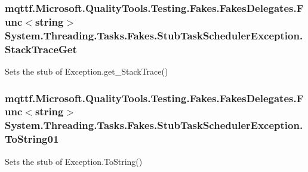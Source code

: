 \hypertarget{class_system_1_1_threading_1_1_tasks_1_1_fakes_1_1_stub_task_scheduler_exception_a90722a633e78193a75e29cc13f26b8ec}{
\subsubsection[{Stack\-Trace\-Get}]{\setlength{\rightskip}{0pt plus 5cm}mqttf.\-Microsoft.\-Quality\-Tools.\-Testing.\-Fakes.\-Fakes\-Delegates.\-Func$<$string$>$ System.\-Threading.\-Tasks.\-Fakes.\-Stub\-Task\-Scheduler\-Exception.\-Stack\-Trace\-Get}}\label{class_system_1_1_threading_1_1_tasks_1_1_fakes_1_1_stub_task_scheduler_exception_a90722a633e78193a75e29cc13f26b8ec}


Sets the stub of Exception.\-get\-\_\-\-Stack\-Trace()

\hypertarget{class_system_1_1_threading_1_1_tasks_1_1_fakes_1_1_stub_task_scheduler_exception_a94ee346883160dba8180ee9e7bd707b6}{
\subsubsection[{To\-String01}]{\setlength{\rightskip}{0pt plus 5cm}mqttf.\-Microsoft.\-Quality\-Tools.\-Testing.\-Fakes.\-Fakes\-Delegates.\-Func$<$string$>$ System.\-Threading.\-Tasks.\-Fakes.\-Stub\-Task\-Scheduler\-Exception.\-To\-String01}}\label{class_system_1_1_threading_1_1_tasks_1_1_fakes_1_1_stub_task_scheduler_exception_a94ee346883160dba8180ee9e7bd707b6}


Sets the stub of Exception.\-To\-String()



